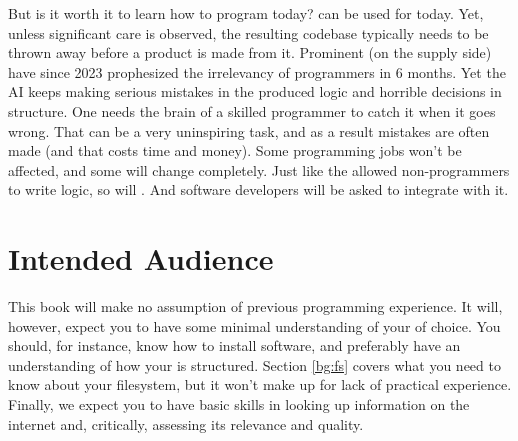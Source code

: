 But is it worth it to learn how to program today?  can be used for  today. Yet, unless significant care is observed, the resulting codebase typically needs to be thrown away before a product is made from it. Prominent  (on the supply side) have since 2023 prophesized the irrelevancy of programmers in 6 months. Yet the AI keeps making serious mistakes in the produced logic and horrible decisions in structure. One needs the brain of a skilled programmer to catch it when it goes wrong. That can be a very uninspiring task, and as a result mistakes are often made (and that costs time and money). Some programming jobs won't be affected, and some will change completely. Just like the  allowed non-programmers to write logic, so will . And software developers will be asked to integrate with it.

\section{Intended Audience}

This book will make no assumption of previous programming experience. It will, however, expect you to have some minimal understanding of your  of choice. You should, for instance, know how to install software, and preferably have an understanding of how your  is structured. Section \ref{bg:fs} covers what you need to know about your filesystem, but it won't make up for lack of practical experience. Finally, we expect you to have basic skills in looking up information on the internet and, critically, assessing its relevance and quality.

